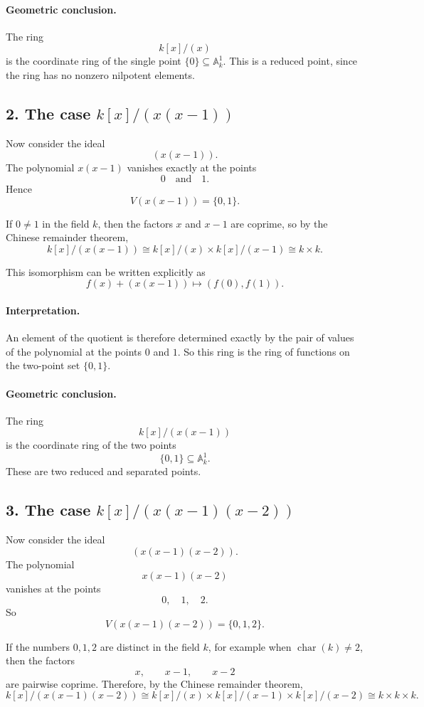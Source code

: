 \documentclass[12pt,a4paper]{article}
\theoremstyle{notespace}
\begin{document}
\paragraph{Geometric conclusion.}
The ring
\[
k[x]/(x)
\]
is the coordinate ring of the single point \(\{0\}\subseteq \mathbb A_k^1\). This is a reduced point, since the ring has no nonzero nilpotent elements.

\subsection*{2. The case \(k[x]/(x(x-1))\)}

Now consider the ideal
\[
(x(x-1)).
\]
The polynomial \(x(x-1)\) vanishes exactly at the points
\[
0 \quad\text{and}\quad 1.
\]
Hence
\[
V(x(x-1))=\{0,1\}.
\]

If \(0\neq 1\) in the field \(k\), then the factors \(x\) and \(x-1\) are coprime, so by the Chinese remainder theorem,
\[
k[x]/(x(x-1))
\cong
k[x]/(x)\times k[x]/(x-1)
\cong
k\times k.
\]

This isomorphism can be written explicitly as
\[
f(x)+(x(x-1))
\longmapsto
(f(0),f(1)).
\]

\paragraph{Interpretation.}
An element of the quotient is therefore determined exactly by the pair of values of the polynomial at the points \(0\) and \(1\). So this ring is the ring of functions on the two-point set \(\{0,1\}\).

\paragraph{Geometric conclusion.}
The ring
\[
k[x]/(x(x-1))
\]
is the coordinate ring of the two points
\[
\{0,1\}\subseteq \mathbb A_k^1.
\]
These are two reduced and separated points.

\subsection*{3. The case \(k[x]/(x(x-1)(x-2))\)}

Now consider the ideal
\[
(x(x-1)(x-2)).
\]
The polynomial
\[
x(x-1)(x-2)
\]
vanishes at the points
\[
0,\quad 1,\quad 2.
\]
So
\[
V(x(x-1)(x-2))=\{0,1,2\}.
\]

If the numbers \(0,1,2\) are distinct in the field \(k\), for example when \(\operatorname{char}(k)\neq 2\), then the factors
\[
x,\qquad x-1,\qquad x-2
\]
are pairwise coprime. Therefore, by the Chinese remainder theorem,
\[
k[x]/(x(x-1)(x-2))
\cong
k[x]/(x)\times k[x]/(x-1)\times k[x]/(x-2)
\cong
k\times k\times k.
\]
\end{document}
